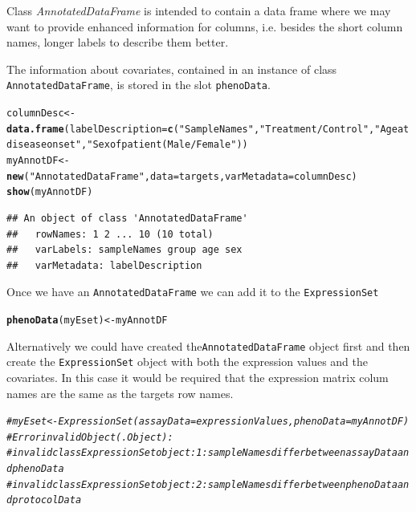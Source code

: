 \documentclass[a4paper]{article}\usepackage[]{graphicx}\usepackage[]{color}
\makeatletter
\newcommand{\hlstr}[1]{\textcolor[rgb]{0.192,0.494,0.8}{#1}}%
\newcommand{\hlcom}[1]{\textcolor[rgb]{0.678,0.584,0.686}{\textit{#1}}}%
\newcommand{\hlstd}[1]{\textcolor[rgb]{0.345,0.345,0.345}{#1}}%
\newcommand{\hlkwb}[1]{\textcolor[rgb]{0.69,0.353,0.396}{#1}}%
\newcommand{\hlkwc}[1]{\textcolor[rgb]{0.333,0.667,0.333}{#1}}%
\newcommand{\hlkwd}[1]{\textcolor[rgb]{0.737,0.353,0.396}{\textbf{#1}}}%
\newenvironment{kframe}{%
 \def\at@end@of@kframe{}%
 \ifinner\ifhmode%
  \def\at@end@of@kframe{\end{minipage}}%
  \begin{minipage}{\columnwidth}%
 \fi\fi%
 \def\FrameCommand##1{\hskip\@totalleftmargin \hskip-\fboxsep
 \colorbox{shadecolor}{##1}\hskip-\fboxsep
     \hskip-\linewidth \hskip-\@totalleftmargin \hskip\columnwidth}%
 \MakeFramed {\advance\hsize-\width
   \@totalleftmargin\z@ \linewidth\hsize
   \@setminipage}}%
 {\par\unskip\endMakeFramed%
 \at@end@of@kframe}
\newenvironment{knitrout}{}{} %
\newcommand{\Rclass}[1]{{\textit{#1}}}
\makeatother
\begin{document}
Class \Rclass{AnnotatedDataFrame} is intended to contain a data frame where we may want to provide enhanced information for columns, i.e. besides the short column names, longer labels to describe them better.

The information about covariates, contained in an instance of class \texttt{AnnotatedDataFrame}, is stored in the slot \texttt{phenoData}.

\begin{knitrout}
\color{fgcolor}\begin{kframe}
\begin{alltt}
\hlstd{columnDesc} \hlkwb{<-}  \hlkwd{data.frame}\hlstd{(}\hlkwc{labelDescription}\hlstd{=} \hlkwd{c}\hlstd{(}\hlstr{"Sample Names"}\hlstd{,} \hlstr{"Treatment/Control"}\hlstd{,} \hlstr{"Age at disease onset"}\hlstd{,} \hlstr{"Sex of patient (Male/Female"}\hlstd{))}
\hlstd{myAnnotDF} \hlkwb{<-} \hlkwd{new}\hlstd{(}\hlstr{"AnnotatedDataFrame"}\hlstd{,} \hlkwc{data}\hlstd{=targets,} \hlkwc{varMetadata}\hlstd{= columnDesc)}
\hlkwd{show}\hlstd{(myAnnotDF)}
\end{alltt}
\begin{verbatim}
## An object of class 'AnnotatedDataFrame'
##   rowNames: 1 2 ... 10 (10 total)
##   varLabels: sampleNames group age sex
##   varMetadata: labelDescription
\end{verbatim}
\end{kframe}
\end{knitrout}

Once we have an \texttt{AnnotatedDataFrame} we can add it to the \texttt{ExpressionSet}

\begin{knitrout}
\color{fgcolor}\begin{kframe}
\begin{alltt}
\hlkwd{phenoData}\hlstd{(myEset)} \hlkwb{<-} \hlstd{myAnnotDF}
\end{alltt}
\end{kframe}
\end{knitrout}

Alternatively we could have created the\texttt{AnnotatedDataFrame} object first and then create the \texttt{ExpressionSet} object with both the expression values and the covariates. In this case it would be required that the expression matrix colum names are the same as the targets row names.

\begin{knitrout}
\color{fgcolor}\begin{kframe}
\begin{alltt}
\hlcom{# myEset <- ExpressionSet(assayData=expressionValues, phenoData=myAnnotDF)}
\hlcom{# Error in validObject(.Object) : }
\hlcom{#   invalid class ExpressionSet object: 1: sampleNames differ between assayData and phenoData}
\hlcom{# invalid class ExpressionSet object: 2: sampleNames differ between phenoData and protocolData}
\end{alltt}
\end{kframe}
\end{knitrout}
\end{document}
